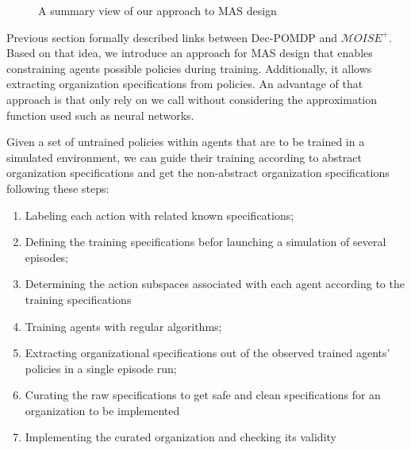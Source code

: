 \documentclass[runningheads]{llncs}
\begin{document}

\begin{figure}[h!]
  \centering
  
  \caption{A summary view of our approach to MAS design}
  \label{fig:design_approach}
\end{figure}

Previous section formally described links between Dec-POMDP and $\mathcal{M}OISE^+$. Based on that idea, we introduce an approach for MAS design that enables constraining agents possible policies during training. Additionally, it allows extracting organization specifications from policies. An advantage of that approach is that only rely on  we call  without considering the approximation function used such as neural networks.

Given a set of untrained policies within agents that are to be trained in a simulated environment, we can guide their training according to abstract organization specifications and get the non-abstract organization specifications following these steps:
\begin{enumerate}
  \item Labeling each action with related known specifications;
  \item Defining the training specifications befor launching a simulation of several episodes;
  \item Determining the action subspaces associated with each agent according to the training specifications
  \item Training agents with regular algorithms;
  \item Extracting organizational specifications out of the observed trained agents' policies in a single episode run;
  \item Curating the raw specifications to get safe and clean specifications for an organization to be implemented
  \item Implementing the curated organization and checking its validity
\end{enumerate}
\end{document}
